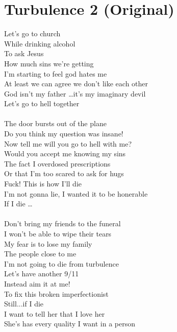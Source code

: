 \documentclass[12pt, b5paper, oneside]{book}
\begin{document}
\section{Turbulence 2 (Original)}
Let's go to church
\\While drinking alcohol
\\To ask Jesus 
\\How much sins we're getting
\\I'm starting to feel god hates me 
\\At least we can agree we don't like each other 
\\God isn't my father \dots it's my imaginary devil
\\Let's go to hell together 
%
\\\\The door bursts out of the plane 
\\Do you think my question was insane!
\\Now tell me will you go to hell with me?
\\Would you accept me knowing my sins
\\The fact I overdosed prescriptions 
\\Or that I'm too scared to ask for hugs
\\Fuck! This is how I'll die 
\\I'm not gonna lie, I wanted it to be honerable
\\If I die \dots 
%
\\\\Don't bring my friends to the funeral
\\I won't be able to wipe their tears 
\\My fear is to lose my family
\\The people close to me
\\I'm not going to die from turbulence
\\Let's have another 9/11
\\Instead aim it at me!
\\To fix this broken imperfectionist 
\\Still...if I die
\\I want to tell her that I love her
\\She's has every quality I want in a person 
\newpage
\end{document}
